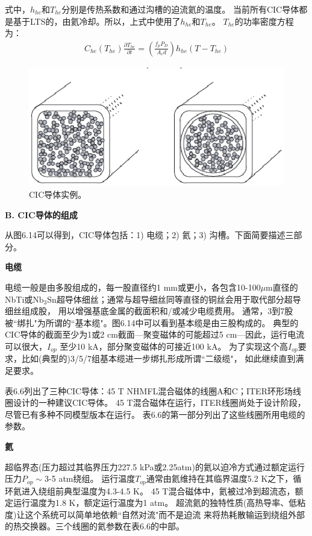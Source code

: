 式中，$h_{he}$和$T_{he}$分别是传热系数和通过沟槽的迫流氦的温度。
当前所有CIC导体都是基于LTS的，由氦冷却。所以，上式中使用了$h_{he}$和$T_{he}$。
$T_{he}$的功率密度方程为：
\begin{align*}%
C_{he}(T_{he})\frac{\partial T_{he}}{\partial t}=(\frac{f_{p}P_D}{A_cd})h_{he}(T-T_{he})
\end{align*}

\begin{figure}[htbp]
	\centering
	\includegraphics[scale=0.7]{chpt6/figs/fig6.14.eps}
	\caption{CIC导体实例。}
\end{figure}

\textbf{B. CIC导体的组成}

从图6.14可以得到，CIC导体包括：1) 电缆；2) 氦；3) 沟槽。下面简要描述三部分。

\textbf{电缆}

电缆一般是由多股组成的，每一股直径约1 mm或更小，各包含10-100$\mu$m直径的
NbTi或$\mathrm{Nb_3Sn}$超导体细丝；通常与超导细丝同等直径的铜丝会用于取代部分超导细丝组成股，
用以增强基底金属的截面积和/或减少电缆费用。
通常，3到7股被``绑扎"为所谓的``基本缆"。图6.14中可以看到基本缆是由三股构成的。
典型的CIC导体的截面至少为1或2 cm截面---聚变磁体的可能超过5 cm---因此，运行电流可以很大，$I_{op}$
至少10 kA，部分聚变磁体的可接近100 kA。
为了实现这个高$I_{op}$要求，比如(典型的)3/5/7组基本缆进一步绑扎形成所谓``二级缆"，
如此继续直到满足要求。

表6.6列出了三种CIC导体：45 T NHMFL混合磁体的线圈A和C；ITER环形场线圈设计的一种建议CIC导体。
45 T混合磁体在运行，ITER线圈尚处于设计阶段，尽管已有多种不同模型版本在运行。
表6.6的第一部分列出了这些线圈所用电缆的参数。

\textbf{氦}

超临界态(压力超过其临界压力227.5 kPa或2.25atm)的氦以迫冷方式通过额定运行压力$P_{op}\sim$3-5 atm绕组。
运行温度$T_{op}$通常由氦维持在其临界温度5.2 K之下，循环氦进入绕组前典型温度为4.3-4.5 K。
45 T混合磁体中，氦被过冷到超流态，额定运行温度为1.8 K，额定运行温度为1 atm。
超流氦的独特性质(高热导率、低粘度)让这个系统可以简单地依赖``自然对流"而不是迫流
来将热耗散输运到绕组外部的热交换器。三个线圈的氦参数在表6.6的中部。

